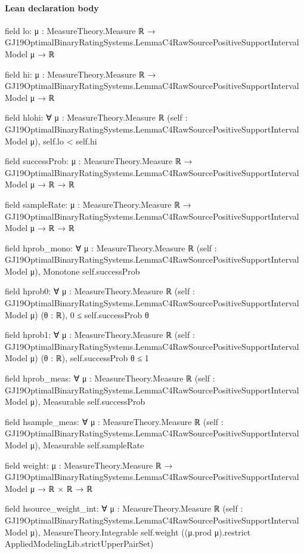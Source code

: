 \documentclass[10pt]{article}
\begin{document}
\paragraph{Lean declaration body}
\begin{ReviewVerbatim}
field lo:
{μ : MeasureTheory.Measure ℝ} → GJ19OptimalBinaryRatingSystems.LemmaC4RawSourcePositiveSupportIntervalModel μ → ℝ

field hi:
{μ : MeasureTheory.Measure ℝ} → GJ19OptimalBinaryRatingSystems.LemmaC4RawSourcePositiveSupportIntervalModel μ → ℝ

field hlohi:
∀ {μ : MeasureTheory.Measure ℝ} (self : GJ19OptimalBinaryRatingSystems.LemmaC4RawSourcePositiveSupportIntervalModel μ),
  self.lo < self.hi

field successProb:
{μ : MeasureTheory.Measure ℝ} → GJ19OptimalBinaryRatingSystems.LemmaC4RawSourcePositiveSupportIntervalModel μ → ℝ → ℝ

field sampleRate:
{μ : MeasureTheory.Measure ℝ} → GJ19OptimalBinaryRatingSystems.LemmaC4RawSourcePositiveSupportIntervalModel μ → ℝ → ℝ

field hprob_mono:
∀ {μ : MeasureTheory.Measure ℝ} (self : GJ19OptimalBinaryRatingSystems.LemmaC4RawSourcePositiveSupportIntervalModel μ),
  Monotone self.successProb

field hprob0:
∀ {μ : MeasureTheory.Measure ℝ} (self : GJ19OptimalBinaryRatingSystems.LemmaC4RawSourcePositiveSupportIntervalModel μ)
  (θ : ℝ), 0 ≤ self.successProb θ

field hprob1:
∀ {μ : MeasureTheory.Measure ℝ} (self : GJ19OptimalBinaryRatingSystems.LemmaC4RawSourcePositiveSupportIntervalModel μ)
  (θ : ℝ), self.successProb θ ≤ 1

field hprob_meas:
∀ {μ : MeasureTheory.Measure ℝ} (self : GJ19OptimalBinaryRatingSystems.LemmaC4RawSourcePositiveSupportIntervalModel μ),
  Measurable self.successProb

field hsample_meas:
∀ {μ : MeasureTheory.Measure ℝ} (self : GJ19OptimalBinaryRatingSystems.LemmaC4RawSourcePositiveSupportIntervalModel μ),
  Measurable self.sampleRate

field weight:
{μ : MeasureTheory.Measure ℝ} →
  GJ19OptimalBinaryRatingSystems.LemmaC4RawSourcePositiveSupportIntervalModel μ → ℝ × ℝ → ℝ

field hsource_weight_int:
∀ {μ : MeasureTheory.Measure ℝ} (self : GJ19OptimalBinaryRatingSystems.LemmaC4RawSourcePositiveSupportIntervalModel μ),
  MeasureTheory.Integrable self.weight ((μ.prod μ).restrict AppliedModelingLib.strictUpperPairSet)


\end{ReviewVerbatim}
\end{document}
